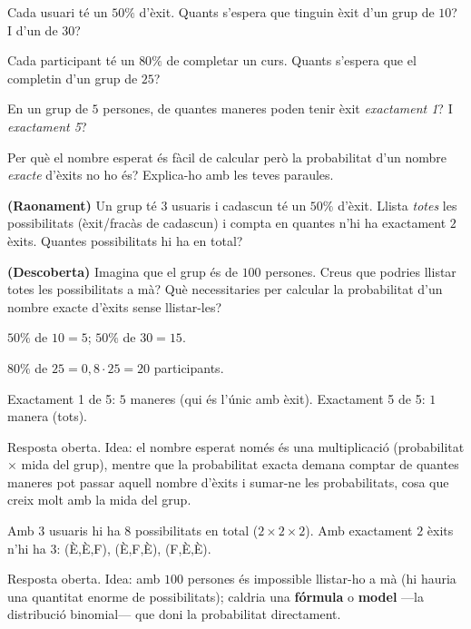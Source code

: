 \begin{exercicis}
\begin{exlist}
  \item Cada usuari té un $50\%$ d'èxit. Quants s'espera que tinguin èxit d'un grup de
        $10$? I d'un de $30$?
  \item Cada participant té un $80\%$ de completar un curs. Quants s'espera que el
        completin d'un grup de $25$?
  \item En un grup de $5$ persones, de quantes maneres poden tenir èxit \emph{exactament
        1}? I \emph{exactament 5}?
  \item Per què el nombre esperat és fàcil de calcular però la probabilitat d'un nombre
        \emph{exacte} d'èxits no ho és? Explica-ho amb les teves paraules.
  \item \textbf{(Raonament)} Un grup té $3$ usuaris i cadascun té un $50\%$ d'èxit.
        Llista \emph{totes} les possibilitats (èxit/fracàs de cadascun) i compta en
        quantes n'hi ha exactament $2$ èxits. Quantes possibilitats hi ha en total?
  \item \textbf{(Descoberta)} Imagina que el grup és de $100$ persones. Creus que podries
        llistar totes les possibilitats a mà? Què necessitaries per calcular la
        probabilitat d'un nombre exacte d'èxits sense llistar-les?
\end{exlist}
\end{exercicis}

\begin{solucions}
\begin{sollist}
  \item $50\%$ de $10=5$; $50\%$ de $30=15$.
  \item $80\%$ de $25=0,8\cdot 25=20$ participants.
  \item Exactament 1 de 5: $5$ maneres (qui és l'únic amb èxit). Exactament 5 de 5:
        $1$ manera (tots).
  \item Resposta oberta. Idea: el nombre esperat només és una multiplicació
        (probabilitat $\times$ mida del grup), mentre que la probabilitat exacta demana
        comptar de quantes maneres pot passar aquell nombre d'èxits i sumar-ne les
        probabilitats, cosa que creix molt amb la mida del grup.
  \item Amb 3 usuaris hi ha $8$ possibilitats en total ($2\times 2\times 2$). Amb
        exactament $2$ èxits n'hi ha $3$: (È,È,F), (È,F,È), (F,È,È).
  \item Resposta oberta. Idea: amb $100$ persones és impossible llistar-ho a mà (hi
        hauria una quantitat enorme de possibilitats); caldria una \textbf{fórmula} o
        \textbf{model} —la distribució binomial— que doni la probabilitat directament.
\end{sollist}
\end{solucions}
